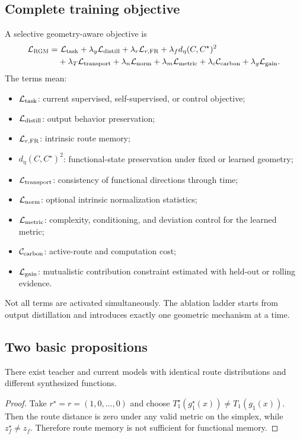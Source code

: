 \subsection{Complete training objective}
A selective geometry-aware objective is
\begin{align}
  \mathcal{L}_{\textsc{RGM}}
  =&\ \mathcal{L}_{\mathrm{task}}
  + \lambda_y \mathcal{L}_{\mathrm{distill}}
  + \lambda_r \mathcal{L}_{r,\mathrm{FR}}
  + \lambda_f d_\eta(C,C^\star)^2 \\
  &+ \lambda_T \mathcal{L}_{\mathrm{transport}}
  + \lambda_n \mathcal{L}_{\mathrm{norm}}
  + \lambda_m \mathcal{L}_{\mathrm{metric}}
  + \lambda_c \mathcal{C}_{\mathrm{carbon}}
  + \lambda_g \mathcal{L}_{\mathrm{gain}}.
  \label{eq:full-objective}
\end{align}
The terms mean:
\begin{itemize}[leftmargin=1.5em]
  \item $\mathcal{L}_{\mathrm{task}}$: current supervised, self-supervised, or control objective;
  \item $\mathcal{L}_{\mathrm{distill}}$: output behavior preservation;
  \item $\mathcal{L}_{r,\mathrm{FR}}$: intrinsic route memory;
  \item $d_\eta(C,C^\star)^2$: functional-state preservation under fixed or learned geometry;
  \item $\mathcal{L}_{\mathrm{transport}}$: consistency of functional directions through time;
  \item $\mathcal{L}_{\mathrm{norm}}$: optional intrinsic normalization statistics;
  \item $\mathcal{L}_{\mathrm{metric}}$: complexity, conditioning, and deviation control for the learned metric;
  \item $\mathcal{C}_{\mathrm{carbon}}$: active-route and computation cost;
  \item $\mathcal{L}_{\mathrm{gain}}$: mutualistic contribution constraint estimated with held-out or rolling evidence.
\end{itemize}

Not all terms are activated simultaneously. The ablation ladder starts from output distillation and introduces exactly one geometric mechanism at a time.

\subsection{Two basic propositions}

\begin{proposition}
There exist teacher and current models with identical route distributions and different synthesized functions.
\end{proposition}
\begin{proof}
Take $r^\star=r=(1,0,\ldots,0)$ and choose $T_1^\star(g_1^\star(x))\neq T_1(g_1(x))$. Then the route distance is zero under any valid metric on the simplex, while $z_f^\star\neq z_f$. Therefore route memory is not sufficient for functional memory.
\end{proof}


